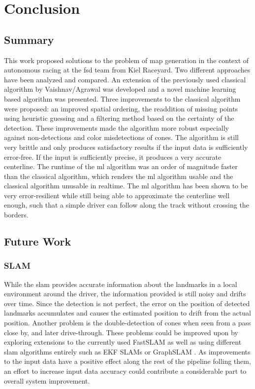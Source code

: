 \chapter{Conclusion}
\label{chap:end}

\section{Summary}
This work proposed solutions to the problem of map generation in the context of autonomous racing at the \ac{fsd} team from Kiel Raceyard. Two different approaches have been analyzed and compared. An extension of the previously used classical algorithm by Vaishnav/Agrawal was developed and a novel machine learning based algorithm was presented. Three improvements to the classical algorithm were proposed: an improved spatial ordering, the readdition of missing points using heuristic guessing and a filtering method based on the certainty of the detection. These improvements made the algorithm more robust especially against non-detections and color misdetections of cones. The algorithm is still very brittle and only produces satisfactory results if the input data is sufficiently error-free. If the input is sufficiently precise, it produces a very accurate centerline. The runtime of the \ac{ml} algorithm was an order of magnitude faster than the classical algorithm, which renders the \ac{ml} algorithm usable and the classical algorithm unusable in realtime. The \ac{ml} algorithm has been shown to be very error-resilient while still being able to approximate the centerline well enough, such that a simple driver can follow along the track without crossing the borders.

\section{Future Work}
\subsection{SLAM} 
While the \ac{slam} provides accurate information about the landmarks in a local environment around the driver, the information provided is still noisy and drifts over time. Since the detection is not perfect, the error on the position of detected landmarks accumulates and causes the estimated position to drift from the actual position. Another problem is the double-detection of cones when seen from a pass close by, and later drive-through. These problems could be improved upon by exploring extensions to the currently used FastSLAM \cite{FastSLAM2002} as well as using different \ac{slam} algorithms entirely such as EKF SLAMs \cite{EKFSLAM1986} or GraphSLAM \cite{graphSLAM2006}. As improvements to the input data have a positive effect along the rest of the pipeline folling them, an effort to increase input data accuracy could contribute a considerable part to overall system improvement.
